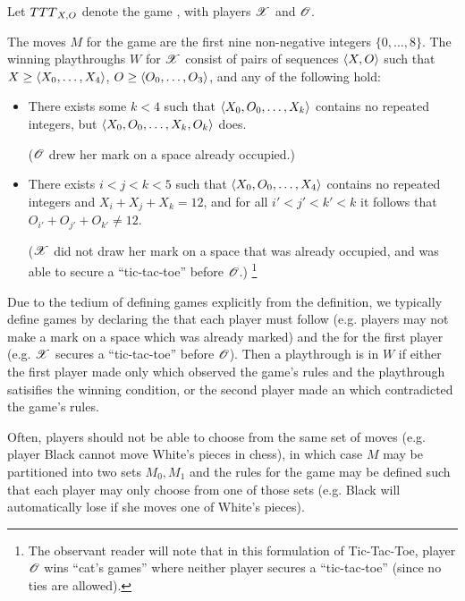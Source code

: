 \begin{game}
  Let ${TTT}_{X,O}$ denote the game , with players $\mathscr{X}$ 
  and $\mathscr{O}$.

  The moves $M$ for the game are the first nine non-negative 
  integers $\{0,\dots,8\}$. The winning playthroughs $W$ for $\mathscr{X}$ 
  consist of pairs of sequences $\langle X,O\rangle$ such that $X\geq\langle X_0,\dots,X_4\rangle$,
  $O\geq\langle O_0,\dots,O_3\rangle$, and any of the following hold:
    \begin{itemize}
      \item There exists some $k<4$ such that $\langle X_0,O_0,\dots,X_k\rangle$ contains
            no repeated integers, but $\langle X_0,O_0,\dots,X_k,O_k\rangle$ does.

            ($\mathscr{O}$ drew her mark on a space already occupied.)
      \item There exists $i<j<k<5$ such that $\langle X_0,O_0,\dots,X_4\rangle$ contains 
            no repeated integers and $X_i+X_j+X_k=12$, and for all
            $i'<j'<k'<k$ it follows that $O_{i'}+O_{j'}+O_{k'}\not=12$.

            ($\mathscr{X}$ did not draw her mark on a space that was already occupied,
            and was able to secure a ``tic-tac-toe'' before $\mathscr{O}$.)
            \footnote{
              The observant reader will note that in this formulation of 
              Tic-Tac-Toe, player $\mathscr{O}$ wins ``cat's games'' where neither 
              player secures a ``tic-tac-toe'' (since no ties are allowed).
            }
    \end{itemize}
\end{game}

Due to the tedium of defining games explicitly from the definition, we 
typically define games by declaring the  that each player must 
follow (e.g. players may not make a mark on a space which was already marked)
and the  for the first player (e.g. $\mathscr{X}$ secures
a ``tic-tac-toe'' before $\mathscr{O}$). Then a playthrough is in $W$ if either 
the first player made only  which observed the game's rules
and the playthrough satisifies the winning condition, or the second player
made an  which contradicted the game's rules.

Often, players should not be able to choose from the same set of moves
(e.g. player Black cannot move White's pieces in chess), in which case $M$ may
be partitioned into two sets $M_0,M_1$ and the rules for the game may be defined
such that each player may only choose from one of those sets 
(e.g. Black will automatically lose if she moves one of White's pieces).

